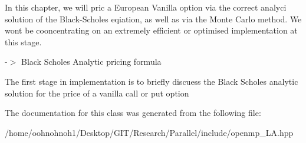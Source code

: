 In this chapter, we will pric a European Vanilla option via the correct analyci solution of the Black-\/\+Scholes eqiation, as well as via the Monte Carlo method. We won\textquotesingle{}t be cooncentrating on an extremely efficient or optimised implementation at this stage.

-\/$>$ Black Scholes Analytic pricing formula

The first stage in implementation is to briefly discuess the Black Scholes analytic solution for the price of a vanilla call or put option 

The documentation for this class was generated from the following file\+:\begin{DoxyCompactItemize}
\item 
/home/oohnohnoh1/\+Desktop/\+G\+I\+T/\+Research/\+Parallel/include/openmp\+\_\+\+L\+A.\+hpp\end{DoxyCompactItemize}
